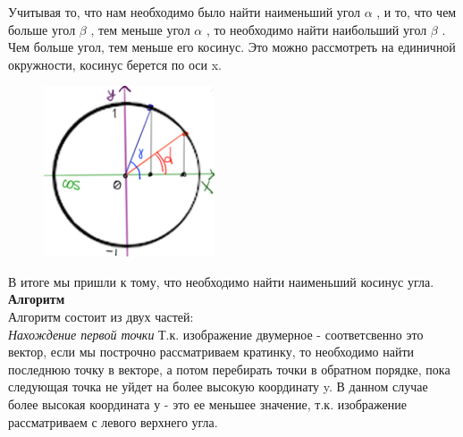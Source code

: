 \documentclass[a4paper]{article}
\begin{document}
Учитывая то, что нам необходимо было найти наименьший угол  $\alpha$ , и то, что чем больше угол $\beta$ , тем меньше угол  $\alpha$ , то необходимо найти наибольший угол $\beta$ .  Чем больше угол, тем меньше его косинус. Это можно рассмотреть на единичной окружности, косинус берется по оси x.

\begin{figure}[h] %
    \centering %
    \includegraphics[width=0.45\textwidth]{image2.png} %
    \caption{} %
    \label{fig:example} %
\end{figure}

В итоге мы пришли к тому, что необходимо найти наименьший косинус угла.
\\
\textbf{Алгоритм}\\
Алгоритм состоит из двух частей:\\
\textit{Нахождение первой точки}
Т.к. изображение двумерное - соответсвенно это вектор, если мы построчно рассматриваем кратинку, то необходимо найти последнюю точку в векторе, а потом перебирать точки в обратном порядке, пока следующая точка не уйдет на более высокую координату y. В данном случае более высокая координата у - это ее меньшее значение, т.к. изображение рассматриваем с левого верхнего угла. 
\end{document}
